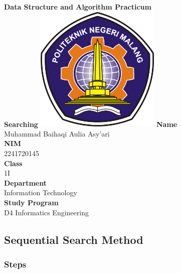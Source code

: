 \documentclass[12pt,titlepage]{article}
\newcommand{\vSubject}{Data Structure and Algorithm Practicum}
\newcommand{\vSubtitle}{Searching}
\newcommand{\vName}{Muhammad Baihaqi Aulia Asy'ari}
\newcommand{\vNIM}{2241720145}
\newcommand{\vClass}{1I}
\newcommand{\vDepartment}{Information Technology}
\newcommand{\vStudyProgram}{D4 Informatics Engineering}
\begin{document}
\begin{titlepage}
    \centering
    \vfill
    {\bfseries\LARGE
        \vSubject\\
        \vskip0.25cm
        \vSubtitle
    }
    \vfill
    \includegraphics[width=6cm]{images/polinema-logo.png}
    \vfill
    {
        \textbf{Name}\\
        \vName\\
        \vskip0.5cm
        \textbf{NIM}\\
        \vNIM\\
        \vskip0.5cm
        \textbf{Class}\\
        \vClass\\
        \vskip0.5cm
        \textbf{Department}\\
        \vDepartment\\
        \vskip0.5cm
        \textbf{Study Program}\\
        \vStudyProgram
    }
\end{titlepage}

\newpage

\setcounter{section}{1}
\setcounter{subsection}{1}
\subsection{Sequential Search Method}
\subsubsection{Steps}
\end{document}
